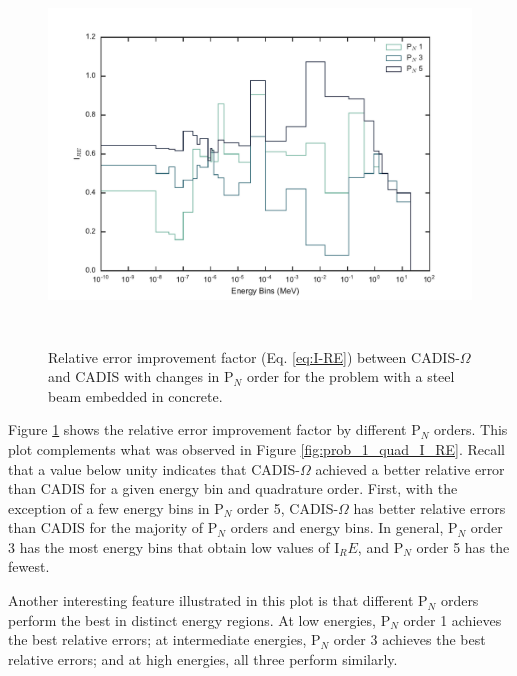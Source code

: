 \begin{figure}[h!]
  \centering
  \includegraphics[height=10cm]{./chapters/characterization_probs/figures/angle/prob_1/compare_err_pN.pdf}
  \caption[Relative error improvement factor (Eq. \eqref{eq:I-RE}) between CADIS-$\Omega$ and
  CADIS with changes in P$_N$ order for steel beam embedded in concrete.]
  {Relative error improvement factor (Eq. \eqref{eq:I-RE}) between CADIS-$\Omega$ and
   CADIS with changes in P$_N$ order for the problem with a
   steel beam embedded in concrete.}
  \label{fig:prob_1_pN_I_RE}
\end{figure}

Figure \ref{fig:prob_1_pN_I_RE} shows the relative error improvement factor by
different P$_N$ orders. This plot complements what was observed in Figure
\ref{fig:prob_1_quad_I_RE}. Recall that a value below unity indicates that
CADIS-$\Omega$ achieved a better relative error than CADIS for a given energy
bin and quadrature order. First, with the exception of a few energy bins in
P$_N$ order 5, CADIS-$\Omega$ has better relative errors than CADIS for the
majority of P$_N$ orders and energy bins. In general, P$_N$ order 3 has the most
energy bins that obtain low values of I$_RE$, and P$_N$ order 5 has the fewest.

Another interesting feature
illustrated in this plot is that different P$_N$ orders perform the best in
distinct energy regions. At low energies, P$_N$ order 1 achieves the best
relative errors; at intermediate energies, P$_N$ order 3 achieves the best
relative errors; and at high energies, all three perform similarly.

